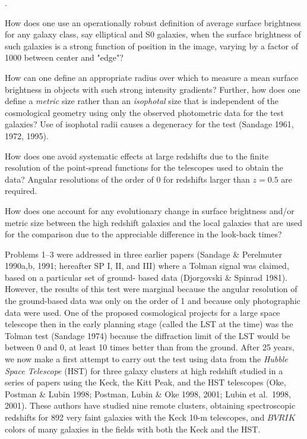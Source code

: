 \documentclass[preprint]{aastex}
\begin{document}
\begin{list}
{.}  {}

\item How does one use an operationally robust definition of average
surface brightness for any galaxy class, say elliptical and S0
galaxies, when the surface brightness of such galaxies is a strong
function of position in the image, varying by a factor of 1000 between
center and "edge"?

\item How can one define an appropriate radius over which to measure a
mean surface brightness in objects with such strong intensity
gradients? Further, how does one define a {\it metric} size rather
than an {\it isophotal} size that is independent of the cosmological
geometry using only the observed photometric data for the test
galaxies? Use of isophotal radii causes a degeneracy for the test
(Sandage 1961, 1972, 1995).

\item How does one avoid systematic effects at large redshifts due to
the finite resolution of the point-spread functions for the telescopes
used to obtain the data? Angular resolutions of the order of
0 for redshifts larger than $z = 0.5$ are required.

\item How does one account for any evolutionary change in surface
brightness and/or metric size between the high redshift galaxies and
the local galaxies that are used for the comparison due to the
appreciable difference in the look-back times?

\end{list}

Problems 1--3 were addressed in three earlier papers (Sandage \&
Perelmuter 1990a,b, 1991; hereafter SP I, II, and III) where a Tolman
signal was claimed, based on a particular set of ground- based data
(Djorgovski \& Spinrad 1981). However, the results of this test were
marginal because the angular resolution of the ground-based data was
only on the order of 1 and because only photographic data
were used. One of the proposed cosmological projects for a large space
telescope then in the early planning stage (called the LST at the
time) was the Tolman test (Sandage 1974) because the diffraction limit
of the LST would be between 0 and 0, at least 10
times better than from the ground.  After 25 years, we now make a
first attempt to carry out the test using data from the {\it Hubble
Space Telescope} (HST) for three galaxy clusters at high redshift
studied in a series of papers using the Keck, the Kitt Peak, and the
HST telescopes (Oke, Postman \& Lubin 1998; Postman, Lubin \& Oke
1998, 2001; Lubin et al.\ 1998, 2001). These authors have studied nine
remote clusters, obtaining spectroscopic redshifts for 892 very faint
galaxies with the Keck 10-m telescopes, and $BVRIK$ colors of many
galaxies in the fields with both the Keck and the HST.
\end{document}
